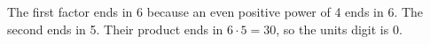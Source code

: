 The first factor ends in 6 because an even positive power of 4 ends in 6. The second ends in 5. Their product ends in $6\cdot5=30$, so the units digit is $\boxed0$.
